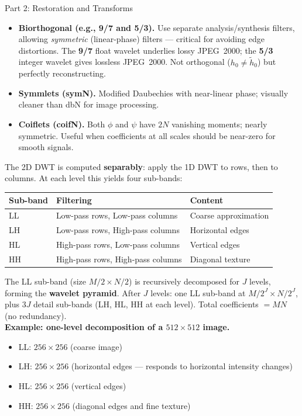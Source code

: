 \documentclass[letterpaper]{article}
\begin{document}
\begin{notes}{Part 2: Restoration and Transforms}
\begin{itemize}
    \item \textbf{Biorthogonal (e.g., 9/7 and 5/3).} Use separate analysis/synthesis filters, allowing \emph{symmetric} (linear-phase) filters — critical for avoiding edge distortions. The \textbf{9/7} float wavelet underlies lossy JPEG~2000; the \textbf{5/3} integer wavelet gives lossless JPEG~2000. Not orthogonal ($h_0\neq\tilde h_0$) but perfectly reconstructing.

    \item \textbf{Symmlets (symN).} Modified Daubechies with near-linear phase; visually cleaner than dbN for image processing.

    \item \textbf{Coiflets (coifN).} Both $\phi$ and $\psi$ have $2N$ vanishing moments; nearly symmetric. Useful when coefficients at all scales should be near-zero for smooth signals.
\end{itemize}


The 2D DWT is computed \textbf{separably}: apply the 1D DWT to rows, then to columns. At each level this yields four sub-bands:

\begin{center}
\begin{tabular}{@{}lll@{}}
\toprule
Sub-band & Filtering & Content \\
\midrule
LL & Low-pass rows, Low-pass columns & Coarse approximation \\
LH & Low-pass rows, High-pass columns & Horizontal edges \\
HL & High-pass rows, Low-pass columns & Vertical edges \\
HH & High-pass rows, High-pass columns & Diagonal texture \\
\bottomrule
\end{tabular}
\end{center}

The LL sub-band (size $M/2 \times N/2$) is recursively decomposed for $J$ levels, forming the \textbf{wavelet pyramid}. After $J$ levels: one LL sub-band at $M/2^J\times N/2^J$, plus $3J$ detail sub-bands (LH, HL, HH at each level). Total coefficients $= MN$ (no redundancy).\\

\textbf{Example: one-level decomposition of a $512\times512$ image.}
\begin{itemize}
    \item LL: $256\times256$ (coarse image)
    \item LH: $256\times256$ (horizontal edges — responds to horizontal intensity changes)
    \item HL: $256\times256$ (vertical edges)
    \item HH: $256\times256$ (diagonal edges and fine texture)
\end{itemize}


\end{notes}
\end{document}
